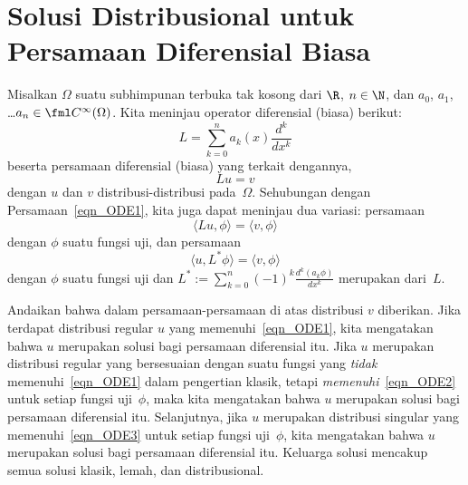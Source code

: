 \section{Solusi Distribusional untuk Persamaan Diferensial Biasa}

\begin{notn} Misalkan $\Omega$ suatu subhimpunan terbuka tak kosong dari $\R$, $n \in \N$, dan $a_0$, $a_1$, \dots $a_n \in \fml C^\infty(\Omega)$.
Kita meninjau operator diferensial (biasa)
berikut:
   \[ L = \sum_{k=0}^n a_k(x)\frac{d^k}{dx^k} \]
beserta persamaan diferensial (biasa)
yang terkait dengannya,
   \begin{equation}\label{eqn_ODE1}
        Lu = v
   \end{equation}
dengan $u$ dan $v$ distribusi-distribusi pada~$\Omega$. Sehubungan dengan Persamaan~\eqref{eqn_ODE1}, kita juga dapat meninjau dua variasi:
persamaan
   \begin{equation}\label{eqn_ODE2}
        \langle Lu, \phi\rangle = \langle v, \phi\rangle
   \end{equation}
dengan $\phi$ suatu fungsi uji, dan persamaan
   \begin{equation}\label{eqn_ODE3}
        \langle u, L^*\phi\rangle = \langle v, \phi\rangle
   \end{equation}
dengan $\phi$ suatu fungsi uji dan $L^* := \displaystyle\sum_{k=0}^n (-1)^k \frac{d^k(a_k\phi)}{dx^k}$ merupakan
 dari~$L$.
\end{notn}

\begin{defn} Andaikan bahwa dalam persamaan-persamaan di atas distribusi $v$ diberikan. Jika terdapat distribusi regular $u$ yang
memenuhi~\eqref{eqn_ODE1}, kita mengatakan bahwa $u$ merupakan solusi
 bagi persamaan diferensial itu. Jika $u$ merupakan distribusi regular yang bersesuaian dengan suatu fungsi yang
\emph{tidak} memenuhi~\eqref{eqn_ODE1} dalam pengertian klasik, tetapi \emph{memenuhi}~\eqref{eqn_ODE2} untuk setiap fungsi uji~$\phi$,
maka kita mengatakan bahwa $u$ merupakan solusi
 bagi persamaan diferensial itu. Selanjutnya, jika $u$ merupakan distribusi singular yang memenuhi~\eqref{eqn_ODE3} untuk setiap fungsi
uji~$\phi$, kita mengatakan bahwa $u$ merupakan solusi
 bagi persamaan diferensial itu. Keluarga solusi
 mencakup semua solusi klasik, lemah, dan distribusional.
\end{defn}


